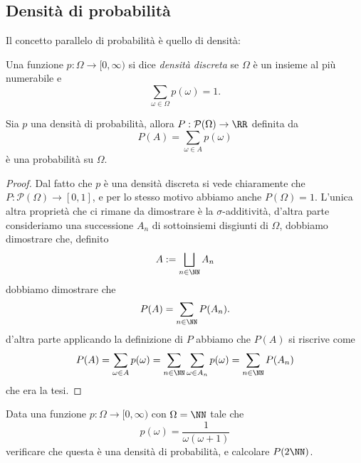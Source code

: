 \documentclass[11pt]{scrartcl}
\newcommand{\parti}[1]{\mathcal{P}\!\left(#1\right)}
\begin{document}
	\subsection{Densità di probabilità}
	Il concetto parallelo di probabilità è quello di densità:
	\begin{definition}
		Una funzione $p:\Omega\to [0,\infty)$ si dice \textit{densità discreta} se $\Omega$ è un insieme al più numerabile e 
		$$\sum_{\omega\in \Omega}p(\omega)=1.$$
	\end{definition}
	\begin{proposition}
		Sia $p$ una densità di probabilità, allora $P:\parti{\Omega}\to \RR$ definita da 
		$$P(A)=\sum_{\omega\in A}p(\omega)$$
		è una probabilità su $\Omega$.
	\end{proposition}
	\begin{proof}
		Dal fatto che $p$ è una densità discreta si vede chiaramente che $P:\parti{\Omega}\to[0,1]$, e per lo stesso motivo abbiamo anche $P(\Omega)=1$. L'unica altra proprietà che ci rimane da dimostrare è la $\sigma$-additività, d'altra parte consideriamo una successione $A_n$ di sottoinsiemi disgiunti di $\Omega$, dobbiamo dimostrare che, definito
		$$A:=\bigsqcup_{n\in\NN}A_n$$
		dobbiamo dimostrare che 
		$$P(A)=\sum_{n\in\NN}P(A_n).$$
		d'altra parte applicando la definizione di $P$ abbiamo che $P(A)$ si riscrive come
		$$P(A)=\sum_{\omega\in A}p(\omega)=\sum_{n\in\NN}\sum_{\omega\in A_n}p(\omega)=\sum_{n\in\NN}P(A_n)$$
		che era la tesi.
	\end{proof}
	\begin{example}
		Data una funzione $p:\Omega \to [0,\infty)$ con $\Omega=\NN$ tale che 
		$$p(\omega)=\frac{1}{\omega(\omega+1)}$$
		verificare che questa è una densità di probabilità, e calcolare $P(2\NN)$.
	\end{example}
\end{document}
